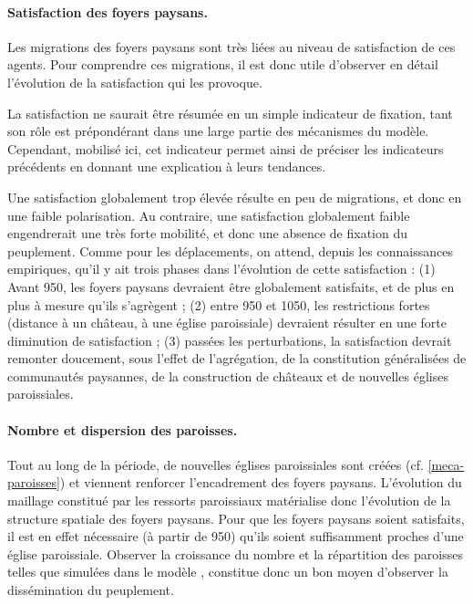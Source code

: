 \paragraph{Satisfaction des foyers paysans.}

Les migrations des foyers paysans sont très liées au niveau de satisfaction de ces agents.
Pour comprendre ces migrations, il est donc utile d'observer en détail l'évolution de la satisfaction qui les provoque.

La satisfaction ne saurait être résumée en un simple indicateur de fixation, tant son rôle est prépondérant dans une large partie des mécanismes du modèle.
Cependant, mobilisé ici, cet indicateur permet ainsi de préciser les indicateurs précédents en donnant une explication à leurs tendances.

Une satisfaction globalement trop élevée résulte en peu de migrations, et donc en une faible polarisation.
Au contraire, une satisfaction globalement faible engendrerait une très forte mobilité, et donc une absence de fixation du peuplement.
Comme pour les déplacements, on attend, depuis les connaissances empiriques, qu'il y ait trois phases dans l'évolution de cette satisfaction :
(1) Avant 950, les foyers paysans devraient être globalement satisfaits, et de plus en plus à mesure qu'ils s'agrègent ;
(2) entre 950 et 1050, les restrictions fortes (distance à un château, à une église paroissiale) devraient résulter en une forte diminution de satisfaction ;
(3) passées les perturbations, la satisfaction devrait remonter doucement, sous l'effet de l'agrégation, de la constitution généralisées de communautés paysannes, de la construction de châteaux et de nouvelles églises paroissiales.

\paragraph{Nombre et dispersion des paroisses.}

Tout au long de la période, de nouvelles églises paroissiales sont créées (cf. \cref{meca-paroisses}) et viennent renforcer l'encadrement des foyers paysans.
L'évolution du maillage constitué par les ressorts paroissiaux matérialise donc l'évolution de la structure spatiale des foyers paysans.
Pour que les foyers paysans soient satisfaits, il est en effet nécessaire (à partir de 950) qu'ils soient suffisamment proches d'une église paroissiale.
Observer la croissance du nombre et la répartition des paroisses telles que simulées dans le modèle \simfeodal{}, constitue donc un bon moyen d'observer la dissémination du peuplement.

